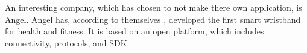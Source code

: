 \documentclass{cslthse-msc}
\begin{document}
An interesting company, which has chosen to not make there own application, is Angel. Angel has, according to themselves \cite{angelfaq}, developed the first smart wristband for health and fitness. It is based on an open platform, which includes connectivity, protocols, and SDK. 









\end{document}
